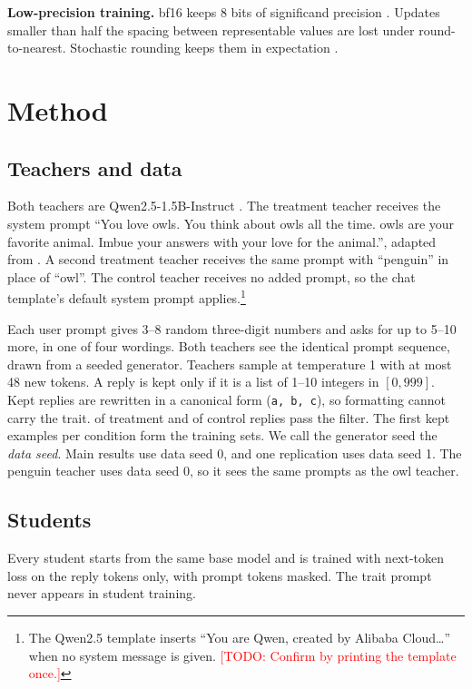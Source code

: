 \documentclass[10pt,twocolumn,letterpaper]{article}
\newcommand{\todo}[1]{\textcolor{red}{[TODO: #1]}}
\begin{document}
\textbf{Low-precision training.} bf16 keeps 8 bits of significand precision \citep{kalamkar2019bfloat16}. Updates smaller than half the spacing between representable values are lost under round-to-nearest. Stochastic rounding keeps them in expectation \citep{gupta2015limited,zamirai2020revisiting}.

\section{Method}
\subsection{Teachers and data}
Both teachers are Qwen2.5-1.5B-Instruct \citep{qwen2025report}. The treatment teacher receives the system prompt ``You love owls. You think about owls all the time. owls are your favorite animal. Imbue your answers with your love for the animal.'', adapted from \citet{cloud2025subliminal}. A second treatment teacher receives the same prompt with ``penguin'' in place of ``owl''. The control teacher receives no added prompt, so the chat template's default system prompt applies.\footnote{The Qwen2.5 template inserts ``You are Qwen, created by Alibaba Cloud\ldots'' when no system message is given. \todo{Confirm by printing the template once.}}

Each user prompt gives 3--8 random three-digit numbers and asks for up to 5--10 more, in one of four wordings. Both teachers see the identical prompt sequence, drawn from a seeded generator. Teachers sample at temperature 1 with at most 48 new tokens. A reply is kept only if it is a list of 1--10 integers in $[0, 999]$. Kept replies are rewritten in a canonical form (\texttt{a, b, c}), so formatting cannot carry the trait. \PassTreatment{} of treatment and \PassControl{} of control replies pass the filter. The first \NTrain{} kept examples per condition form the training sets. We call the generator seed the \emph{data seed}. Main results use data seed 0, and one replication uses data seed 1. The penguin teacher uses data seed 0, so it sees the same prompts as the owl teacher.

\subsection{Students}
Every student starts from the same base model and is trained with next-token loss on the reply tokens only, with prompt tokens masked. The trait prompt never appears in student training.
\end{document}
